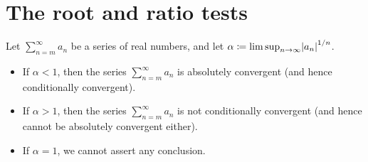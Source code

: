 \section{The root and ratio tests}\label{i:sec:7.5}

\begin{thm}\label{i:7.5.1}
  Let \(\sum_{n = m}^\infty a_n\) be a series of real numbers, and let \(\alpha \coloneqq \limsup_{n \to \infty} \abs{a_n}^{1 / n}\).
  \begin{itemize}
    \item If \(\alpha < 1\), then the series \(\sum_{n = m}^\infty a_n\) is absolutely convergent
          (and hence conditionally convergent).
    \item If \(\alpha > 1\), then the series \(\sum_{n = m}^\infty a_n\) is not conditionally convergent
          (and hence cannot be absolutely convergent either).
    \item If \(\alpha = 1\), we cannot assert any conclusion.
  \end{itemize}
\end{thm}

